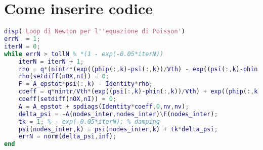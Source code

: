 \documentclass{article}
\begin{document}
\section{Come inserire codice}

	\begin{lstlisting}[language=matlab]
disp('Loop di Newton per l''equazione di Poisson')
errN  = 1;
iterN = 0;
while errN > tollN % *(1 - exp(-0.05*iterN))
    iterN = iterN + 1;
    rho = q*(nintr*(exp((phip(:,k)-psi(:,k))/Vth) - exp((psi(:,k)-phin(:,k))/Vth)) + doping);
    rho(setdiff(nOX,nI)) = 0;
    F = A_epstot*psi(:,k) - Identity*rho;
    coeff = q*nintr/Vth*(exp((psi(:,k)-phin(:,k))/Vth) + exp((phip(:,k)-psi(:,k))/Vth));
    coeff(setdiff(nOX,nI)) = 0;
    A = A_epstot + spdiags(Identity*coeff,0,nv,nv);
    delta_psi = -A(nodes_inter,nodes_inter)\F(nodes_inter);
    tk = 1; % - exp(-0.05*iterN); % damping
    psi(nodes_inter,k) = psi(nodes_inter,k) + tk*delta_psi;
    errN = norm(delta_psi,inf);
end
	\end{lstlisting}

% 
	
\end{document}
